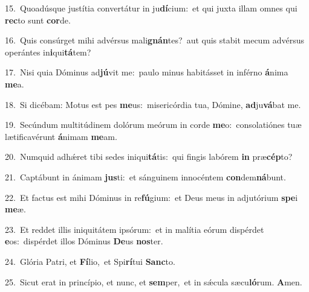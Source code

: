 {\numbfont\textcolor{\numbcolor}{15.}}~Quoadúsque justítia convertátur in ju\-\textbf{dí}\-cium:~\star et qui juxta illam omnes qui \textbf{rec}\-to sunt \textbf{cor}\-de.\par
{\numbfont\textcolor{\numbcolor}{16.}}~Quis consúrget mihi advérsus mali\-\textbf{gnán}\-tes?~\star aut quis stabit mecum advérsus operántes in\-\textbf{i}\-qui\-\textbf{tá}\-tem?\par
{\numbfont\textcolor{\numbcolor}{17.}}~Nisi quia Dóminus ad\-\textbf{jú}\-vit me:~\star paulo minus habitásset in inférno \textbf{á}\-nima \textbf{me}\-a.\par
{\numbfont\textcolor{\numbcolor}{18.}}~Si dicébam: Motus est pes \textbf{me}\-us:~\star misericórdia tua, Dómine, \textbf{ad}\-ju\-\textbf{vá}\-bat me.\par
{\numbfont\textcolor{\numbcolor}{19.}}~Secúndum multitúdinem dolórum meórum in corde \textbf{me}\-o:~\star consolatiónes tuæ lætificavérunt \textbf{á}\-nimam \textbf{me}\-am.\par
{\numbfont\textcolor{\numbcolor}{20.}}~Numquid adhǽret tibi sedes iniqui\-\textbf{tá}\-tis:~\star qui fingis labórem \textbf{in} præ\-\textbf{cép}\-to?\par
{\numbfont\textcolor{\numbcolor}{21.}}~Captábunt in ánimam \textbf{jus}\-ti:~\star et sánguinem innocéntem \textbf{con}\-dem\-\textbf{ná}\-bunt.\par
{\numbfont\textcolor{\numbcolor}{22.}}~Et factus est mihi Dóminus in re\-\textbf{fú}\-gium:~\star et Deus meus in adjutórium \textbf{spe}\-i \textbf{me}\-æ.\par
{\numbfont\textcolor{\numbcolor}{23.}}~Et reddet illis iniquitátem ipsórum:~\dagger et in malítia eórum dispérdet \textbf{e}\-os:~\star dispérdet illos Dóminus \textbf{De}\-us \textbf{nos}\-ter.\par
{\numbfont\textcolor{\numbcolor}{24.}}~Glória Patri, et \textbf{Fí}\-lio,~\star et Spi\-\textbf{rí}\-tui \textbf{Sanc}\-to.\par
{\numbfont\textcolor{\numbcolor}{25.}}~Sicut erat in princípio, et nunc, et \textbf{sem}\-per,~\star et in sǽcula sæcu\-\textbf{ló}\-rum. \textbf{A}\-men.\par
